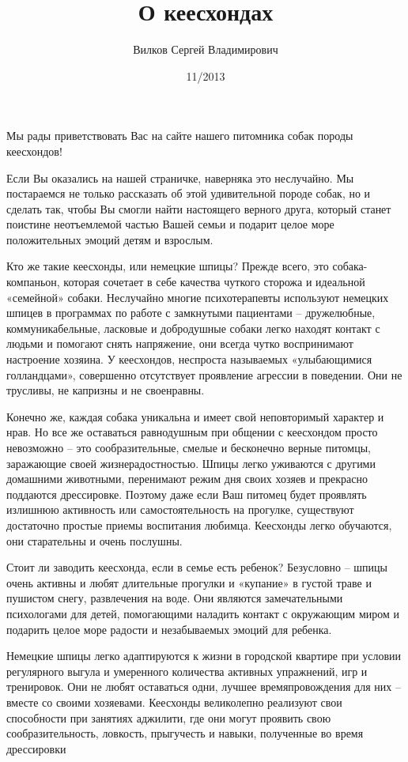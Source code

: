 \documentclass{article}
\title{О кеесхондах}
\author{Вилков Сергей Владимирович}
\date{11/2013}
\begin{document}
  \maketitle
  Мы рады приветствовать Вас на сайте нашего питомника собак
  породы кеесхондов!

  Если Вы оказались на нашей страничке, наверняка это
  неслучайно. Мы постараемся не только рассказать об этой
  удивительной породе собак, но и сделать так, чтобы Вы смогли
  найти настоящего верного друга, который станет поистине
  неотъемлемой частью Вашей семьи и подарит целое море
  положительных эмоций детям и взрослым.

  Кто же такие кеесхонды, или немецкие шпицы? Прежде всего, это
  собака-компаньон, которая сочетает в себе качества чуткого
  сторожа и идеальной «семейной» собаки. Неслучайно многие
  психотерапевты используют немецких шпицев в программах
  по работе с замкнутыми пациентами – дружелюбные,
  коммуникабельные, ласковые и добродушные собаки легко
  находят контакт с людьми и помогают снять напряжение, они
  всегда чутко воспринимают настроение хозяина. У кеесхондов,
  неспроста называемых «улыбающимися голландцами», совершенно
  отсутствует проявление агрессии в поведении. Они не трусливы,
  не капризны и не своенравны.

  Конечно же, каждая собака уникальна и имеет свой неповторимый
  характер и нрав. Но все же оставаться равнодушным при общении
  с кеесхондом просто невозможно – это сообразительные,
  смелые и бесконечно верные питомцы, заражающие своей
  жизнерадостностью. Шпицы легко уживаются с другими домашними
  животными, перенимают режим дня своих хозяев и прекрасно
  поддаются дрессировке. Поэтому даже если Ваш питомец будет
  проявлять излишнюю активность или самостоятельность на
  прогулке, существуют достаточно простые приемы воспитания
  любимца. Кеесхонды легко обучаются, они старательны и очень
  послушны.

  Стоит ли заводить кеесхонда, если в семье есть
  ребенок? Безусловно – шпицы очень активны и любят длительные
  прогулки и «купание» в густой траве и пушистом снегу,
  развлечения на воде. Они являются замечательными психологами
  для детей, помогающими наладить контакт с окружающим миром и
  подарить целое море радости и незабываемых эмоций для ребенка.

  Немецкие шпицы легко адаптируются к жизни в городской
  квартире при условии регулярного выгула и умеренного
  количества активных упражнений, игр и тренировок. Они не любят
  оставаться одни, лучшее времяпровождения для них – вместе
  со своими хозяевами. Кеесхонды великолепно реализуют свои
  способности при занятиях аджилити, где они могут проявить свою
  сообразительность, ловкость, прыгучесть и навыки, полученные
  во время дрессировки
\end{document}
